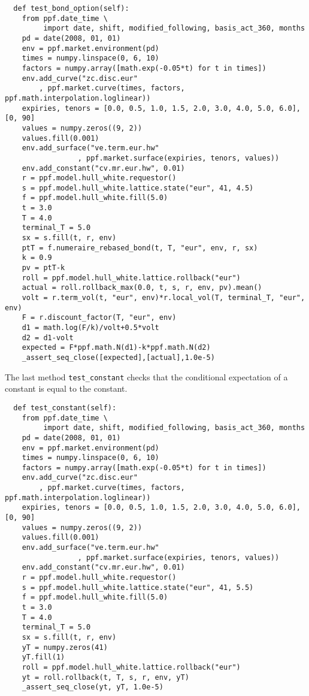 \begin{verbatim}
  def test_bond_option(self):    
    from ppf.date_time \
         import date, shift, modified_following, basis_act_360, months
    pd = date(2008, 01, 01)
    env = ppf.market.environment(pd)
    times = numpy.linspace(0, 6, 10)
    factors = numpy.array([math.exp(-0.05*t) for t in times])
    env.add_curve("zc.disc.eur"
        , ppf.market.curve(times, factors, ppf.math.interpolation.loglinear))
    expiries, tenors = [0.0, 0.5, 1.0, 1.5, 2.0, 3.0, 4.0, 5.0, 6.0], [0, 90]
    values = numpy.zeros((9, 2))
    values.fill(0.001)
    env.add_surface("ve.term.eur.hw"
                 , ppf.market.surface(expiries, tenors, values))
    env.add_constant("cv.mr.eur.hw", 0.01)
    r = ppf.model.hull_white.requestor()
    s = ppf.model.hull_white.lattice.state("eur", 41, 4.5)
    f = ppf.model.hull_white.fill(5.0)
    t = 3.0
    T = 4.0
    terminal_T = 5.0
    sx = s.fill(t, r, env)
    ptT = f.numeraire_rebased_bond(t, T, "eur", env, r, sx)
    k = 0.9
    pv = ptT-k
    roll = ppf.model.hull_white.lattice.rollback("eur")    
    actual = roll.rollback_max(0.0, t, s, r, env, pv).mean()
    volt = r.term_vol(t, "eur", env)*r.local_vol(T, terminal_T, "eur", env)
    F = r.discount_factor(T, "eur", env)
    d1 = math.log(F/k)/volt+0.5*volt
    d2 = d1-volt
    expected = F*ppf.math.N(d1)-k*ppf.math.N(d2)
    _assert_seq_close([expected],[actual],1.0e-5)
\end{verbatim}
The last method \verb|test_constant| checks that the conditional expectation of a constant is equal to the constant.
\begin{verbatim}
  def test_constant(self):
    from ppf.date_time \
         import date, shift, modified_following, basis_act_360, months
    pd = date(2008, 01, 01)
    env = ppf.market.environment(pd)
    times = numpy.linspace(0, 6, 10)
    factors = numpy.array([math.exp(-0.05*t) for t in times])
    env.add_curve("zc.disc.eur"
        , ppf.market.curve(times, factors, ppf.math.interpolation.loglinear))
    expiries, tenors = [0.0, 0.5, 1.0, 1.5, 2.0, 3.0, 4.0, 5.0, 6.0], [0, 90]
    values = numpy.zeros((9, 2))
    values.fill(0.001)
    env.add_surface("ve.term.eur.hw"
                 , ppf.market.surface(expiries, tenors, values))
    env.add_constant("cv.mr.eur.hw", 0.01)
    r = ppf.model.hull_white.requestor()
    s = ppf.model.hull_white.lattice.state("eur", 41, 5.5)
    f = ppf.model.hull_white.fill(5.0)
    t = 3.0
    T = 4.0
    terminal_T = 5.0
    sx = s.fill(t, r, env)
    yT = numpy.zeros(41)
    yT.fill(1)
    roll = ppf.model.hull_white.lattice.rollback("eur")    
    yt = roll.rollback(t, T, s, r, env, yT)
    _assert_seq_close(yt, yT, 1.0e-5)
\end{verbatim}

